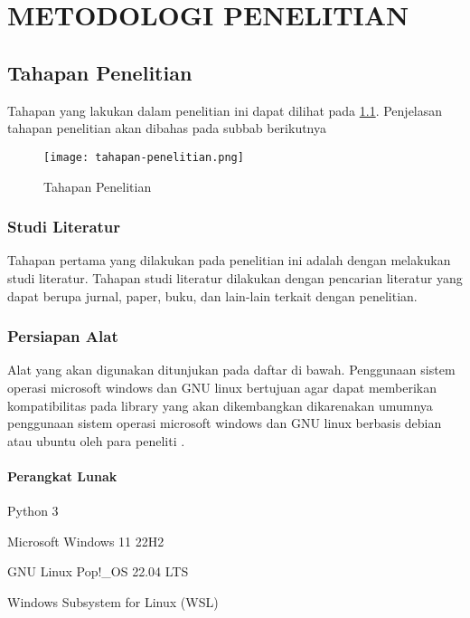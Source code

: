 
\chapter[METODOLOGI PENELITIAN]{\\ METODOLOGI PENELITIAN}

\section{Tahapan Penelitian}
Tahapan yang lakukan dalam penelitian ini dapat dilihat pada \cref{fig:tahapan-penelitian}. Penjelasan tahapan
penelitian akan dibahas pada subbab berikutnya
\begin{figure}[H]
    \centering
    \texttt{[image: tahapan-penelitian.png]}
    \caption{Tahapan Penelitian}
    \label{fig:tahapan-penelitian}
\end{figure}

\subsection{Studi Literatur}
Tahapan pertama yang dilakukan pada penelitian ini adalah dengan melakukan studi literatur. Tahapan studi literatur dilakukan dengan pencarian literatur yang dapat berupa jurnal, paper, buku, dan lain-lain terkait dengan penelitian.

\subsection{Persiapan Alat}
Alat yang akan digunakan ditunjukan pada daftar di bawah. Penggunaan sistem operasi microsoft windows dan GNU linux bertujuan agar dapat memberikan kompatibilitas pada library yang akan dikembangkan dikarenakan umumnya penggunaan sistem operasi microsoft windows dan GNU linux berbasis debian atau ubuntu oleh para peneliti \citep{arora_2020} \citep{stackoverflow}.

\subsubsection{Perangkat Lunak}
\begin{packed_enum}
  \item Python 3
  \item Microsoft Windows 11 22H2
  \item GNU Linux Pop!\_OS 22.04 LTS
  \item Windows Subsystem for Linux (WSL)
\end{packed_enum}

